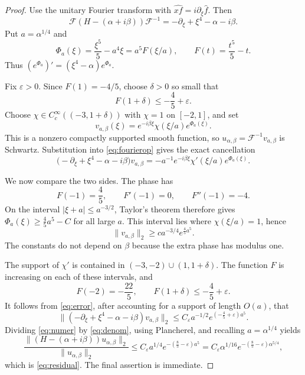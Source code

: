 \documentclass[11pt]{article}
\newcommand{\F}{\mathcal F}
\begin{document}
\begin{proof}
Use the unitary Fourier transform with
$\widehat{xf}=i\partial_\xi\widehat f$.  Then
\begin{equation}\label{eq:fourierop}
 \F(H-(\alpha+i\beta))\F^{-1}
 =-\partial_\xi+\xi^4-\alpha-i\beta.
\end{equation}
Put $a=\alpha^{1/4}$ and
\begin{equation}\label{eq:phase}
 \Phi_a(\xi)=\frac{\xi^5}{5}-a^4\xi
             =a^5F(\xi/a),
 \qquad
 F(t)=\frac{t^5}{5}-t.
\end{equation}
Thus $(e^{\Phi_a})'=(\xi^4-\alpha)e^{\Phi_a}$.

Fix $\varepsilon>0$.  Since $F(1)=-4/5$, choose $\delta>0$ so small that
\begin{equation}\label{eq:delta}
                    F(1+\delta)\le -\frac45+\varepsilon.
\end{equation}
Choose $\chi\in C_c^\infty((-3,1+\delta))$ with
$\chi=1$ on $[-2,1]$, and set
\begin{equation}\label{eq:v}
 v_{a,\beta}(\xi)
 =e^{-i\beta\xi}\chi(\xi/a)e^{\Phi_a(\xi)}.
\end{equation}
This is a nonzero compactly supported smooth function, so
$u_{\alpha,\beta}=\F^{-1}v_{a,\beta}$ is Schwartz.  Substitution into
\eqref{eq:fourierop} gives the exact cancellation
\begin{equation}\label{eq:error}
 \bigl(-\partial_\xi+\xi^4-\alpha-i\beta\bigr)v_{a,\beta}
 =-a^{-1}e^{-i\beta\xi}\chi'(\xi/a)e^{\Phi_a(\xi)}.
\end{equation}

We now compare the two sides.  The phase has
\[
 F(-1)=\frac45,\qquad F'(-1)=0,\qquad F''(-1)=-4.
\]
On the interval $|\xi+a|\le a^{-3/2}$, Taylor's theorem therefore gives
$\Phi_a(\xi)\ge\frac45a^5-C$ for all large $a$.  This interval lies where
$\chi(\xi/a)=1$, hence
\begin{equation}\label{eq:denom}
             \|v_{a,\beta}\|_2
             \ge c a^{-3/4}e^{\frac45a^5}.
\end{equation}
The constants do not depend on $\beta$ because the extra phase has modulus
one.

The support of $\chi'$ is contained in
$(-3,-2)\cup(1,1+\delta)$.  The function $F$ is increasing on each of these
intervals, and
\[
 F(-2)=-\frac{22}{5},\qquad
 F(1+\delta)\le-\frac45+\varepsilon.
\]
It follows from \eqref{eq:error}, after accounting for a support of length
$O(a)$, that
\begin{equation}\label{eq:numer}
 \|(-\partial_\xi+\xi^4-\alpha-i\beta)v_{a,\beta}\|_2
 \le C_\varepsilon a^{-1/2}
       e^{(-\frac45+\varepsilon)a^5}.
\end{equation}
Dividing \eqref{eq:numer} by \eqref{eq:denom}, using Plancherel, and recalling
$a=\alpha^{1/4}$ yields
\[
 \frac{\|(H-(\alpha+i\beta))u_{\alpha,\beta}\|_2}
      {\|u_{\alpha,\beta}\|_2}
 \le C_\varepsilon a^{1/4}
      e^{-(\frac85-\varepsilon)a^5}
 =C_\varepsilon\alpha^{1/16}
      e^{-(\frac85-\varepsilon)\alpha^{5/4}},
\]
which is \eqref{eq:residual}.  The final assertion is immediate.
\end{proof}
\end{document}
